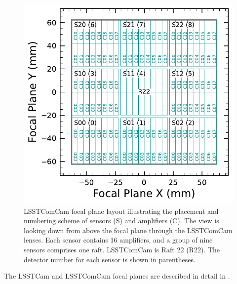 \begin{figure}[htb!]
\includegraphics[width=\linewidth]{ComCam_focal_plane}
\caption{LSSTComCam focal plane layout illustrating the placement and numbering scheme of sensors (S) and amplifiers (C). The view is looking down from above the focal plane through the LSSTComCam lenses. Each sensor contains 16 amplifiers, and a group of nine sensors comprises one raft. LSSTComCam is Raft 22 (R22). The detector number for each sensor is shown in parentheses.}
\label{fig:comcam_focal_plane}
\end{figure}
The \gls{LSSTCam} and \gls{LSSTComCam} focal planes are described in detail in \citet{CTN-001}.

